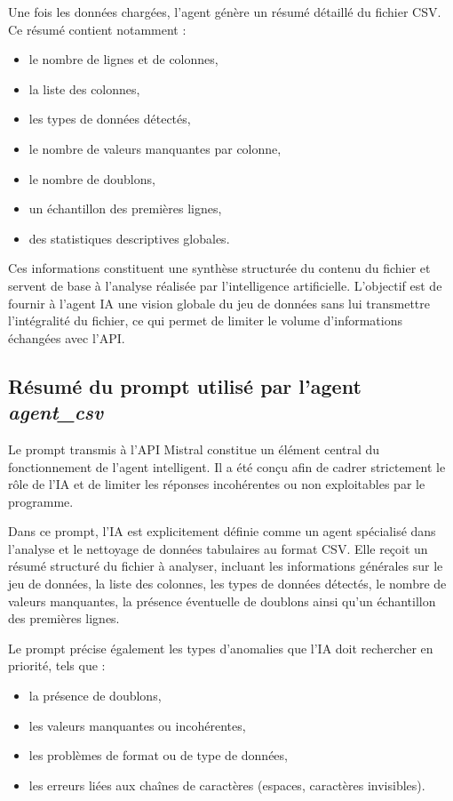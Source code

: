 \documentclass[a4paper, 12pt, twoside]{article}
\begin{document}
Une fois les données chargées, l’agent génère un résumé détaillé du fichier CSV. Ce résumé contient notamment :
\begin{itemize}
    \item le nombre de lignes et de colonnes,
    \item la liste des colonnes,
    \item les types de données détectés,
    \item le nombre de valeurs manquantes par colonne,
    \item le nombre de doublons,
    \item un échantillon des premières lignes,
    \item des statistiques descriptives globales.
\end{itemize}

Ces informations constituent une synthèse structurée du contenu du fichier et servent de base à l’analyse réalisée par l’intelligence artificielle. L’objectif est de fournir à l’agent IA une vision globale du jeu de données sans lui transmettre l’intégralité du fichier, ce qui permet de limiter le volume d’informations échangées avec l’API.

\newpage
\subsection{Résumé du prompt utilisé par l’agent \textit{agent\_csv}}

Le prompt transmis à l’API Mistral constitue un élément central du fonctionnement de l’agent intelligent. Il a été conçu afin de cadrer strictement le rôle de l’IA et de limiter les réponses incohérentes ou non exploitables par le programme.

Dans ce prompt, l’IA est explicitement définie comme un agent spécialisé dans l’analyse et le nettoyage de données tabulaires au format CSV. Elle reçoit un résumé structuré du fichier à analyser, incluant les informations générales sur le jeu de données, la liste des colonnes, les types de données détectés, le nombre de valeurs manquantes, la présence éventuelle de doublons ainsi qu’un échantillon des premières lignes.

Le prompt précise également les types d’anomalies que l’IA doit rechercher en priorité, tels que :
\begin{itemize}
    \item la présence de doublons,
    \item les valeurs manquantes ou incohérentes,
    \item les problèmes de format ou de type de données,
    \item les erreurs liées aux chaînes de caractères (espaces, caractères invisibles).
\end{itemize}
\end{document}
